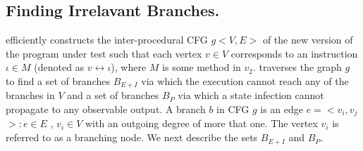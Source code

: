 %

\vspace{-1ex}
\subsection{Finding Irrelavant Branches.}
\vspace{-2ex}
 efficiently constructs the inter-procedural CFG $g<$$V,E$$>$ of 
the new version of the program under test such that each vertex $v \in V$ 
corresponds to an instruction $\iota \in M$ (denoted as $v \leftrightarrow \iota$), where $M$ is some method in $v_2$.  
 traverses the graph $g$ to find a set of branches $B_{E+I}$ via which the execution cannot reach any of the branches in $V$ and a set of branches $B_{P}$ via which a state infection cannot propagate to any observable output. A branch $b$ in CFG $g$ is an edge $e = <$$v_i, v_j$$>: e \in E$ , $v_i \in V$ with an outgoing degree of more that one. The vertex $v_i$ is referred to as a branching node. 
We next describe the sets $B_{E+I}$ and $B_P$.

